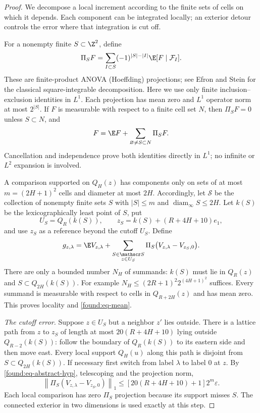 \begin{proof}
We decompose a local increment according to the finite sets of cells
on which it depends.  Each component can be integrated locally; an
exterior detour controls the error where that integration is cut off.

For a nonempty finite $S\subset\Z^2$, define
\[
 \Pi_S F=\sum_{I\subset S}(-1)^{|S|-|I|}
                 \E [F\mid\mathcal F_I].
\]
These are finite-product ANOVA (Hoeffding) projections; see
Efron and Stein \cite[Section~2]{EfronStein1981} for the classical
square-integrable decomposition. Here we use only finite
inclusion--exclusion identities in $L^1$. Each projection has mean
zero and $L^1$ operator norm at most $2^{|S|}$.
If $F$ is measurable with respect to a finite cell set $N$, then
$\Pi_SF=0$ unless $S\subset N$, and
\begin{equation}
 F=\E F+\sum_{\varnothing\ne S\subset N}\Pi_SF.
                                                        \label{found:eq-anova}
\end{equation}
Cancellation and independence prove both identities directly in
$L^1$; no infinite or $L^2$ expansion is involved.

A comparison supported on $Q_H(z)$ has components only on sets of
at most $m=(2H+1)^2$ cells and diameter at most $2H$.  Accordingly,
let $\mathscr S$ be the collection of nonempty finite
sets $S$ with $|S|\leq m$ and $\operatorname{diam}_\infty S\leq2H$.
Let $k(S)$ be the lexicographically least point of $S$, put
\[
 U_S=Q_R(k(S)),\qquad
 z_S=k(S)+(R+4H+10)e_1,
\]
and use $z_S$ as a reference beyond the cutoff $U_S$.  Define
\begin{equation}
 g_{z,\lambda}=\E V_{z,\lambda}
    +\sum_{\substack{S\in\mathscr S\\z\in U_S}}
       \Pi_S\bigl(V_{z,\lambda}-V_{z_S,0}\bigr).
                                                        \label{found:eq-gauge-formula}
\end{equation}
There are only a bounded number $N_H$ of summands: $k(S)$ must lie in
$Q_R(z)$ and $S\subset Q_{2H}(k(S))$.  For example
$N_H\leq(2R+1)^2 2^{(4H+1)^2}$ suffices.  Every summand is measurable
with respect to cells in $Q_{R+2H}(z)$ and has mean zero.  This proves
locality and \eqref{found:eq-mean}.

\emph{The cutoff error.}
Suppose $z\in U_S$ but a neighbor $z'$ lies outside.  There is a
lattice path from $z$ to
$z_S$ of length at most $20(R+4H+10)$ lying outside
$Q_{R-2}(k(S))$: follow the boundary of $Q_R(k(S))$ to its eastern
side and then move east.  Every local support $Q_H(u)$ along this path
is disjoint from $S\subset Q_{2H}(k(S))$.  If necessary first switch
from label $\lambda$ to label $0$ at $z$.  By
\eqref{found:eq-abstract-hyp}, telescoping and the projection norm,
\begin{equation}
 \left\|\Pi_S(V_{z,\lambda}-V_{z_S,0})\right\|_1
 \leq [20(R+4H+10)+1]2^m\varepsilon.
                                                        \label{found:eq-boundary}
\end{equation}
Each local comparison has zero $\Pi_S$ projection because its support
misses $S$.  The connected exterior in two dimensions is used exactly
at this step.


\end{proof}
